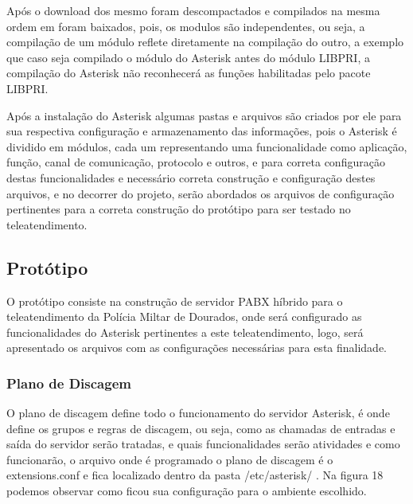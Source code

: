 Após o download dos mesmo foram descompactados e compilados na  mesma ordem em foram baixados, pois, os modulos são independentes, ou seja, a compilação de um módulo reflete diretamente na compilação do outro, a exemplo que caso seja compilado o módulo do Asterisk antes do módulo LIBPRI, a compilação do Asterisk não reconhecerá as funções habilitadas pelo pacote LIBPRI.

Após a instalação do Asterisk algumas pastas e arquivos são criados por ele para sua respectiva configuração e armazenamento das informações, pois o Asterisk é dividido em módulos, cada um representando uma funcionalidade como aplicação, função, canal de comunicação, protocolo e outros, e para correta configuração destas funcionalidades e necessário correta construção e configuração destes arquivos, e no decorrer do projeto, serão abordados os arquivos de configuração pertinentes para a correta construção do protótipo para ser testado no teleatendimento.

\subsection{Protótipo}
O protótipo consiste na construção de servidor PABX híbrido para o teleatendimento da Polícia Miltar de Dourados, onde será configurado as funcionalidades do Asterisk pertinentes a este teleatendimento, logo, será apresentado os arquivos com as configurações necessárias para esta finalidade.

\subsubsection{Plano de Discagem}
O plano de discagem define todo o funcionamento do servidor Asterisk, é onde define os grupos e regras de discagem, ou seja, como as chamadas de entradas e saída do servidor serão tratadas, e quais funcionalidades serão atividades e como funcionarão, o arquivo onde é programado o plano de discagem é o extensions.conf e fica localizado dentro da pasta /etc/asterisk/ \cite{alexandrekeller2014}.
Na figura 18 podemos observar como ficou sua configuração para o ambiente escolhido.